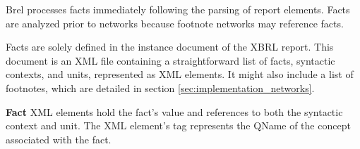






Brel processes facts immediately following the parsing of report elements.
Facts are analyzed prior to networks because footnote networks may reference facts.

Facts are solely defined in the instance document of the XBRL report.
This document is an XML file containing a straightforward list of facts, syntactic contexts, and units, represented as XML elements.
It might also include a list of footnotes, which are detailed in section \ref{sec:implementation_networks}.

\textbf{Fact} XML elements hold the fact's value and references to both the syntactic context and unit.
The XML element's tag represents the QName of the concept associated with the fact.

